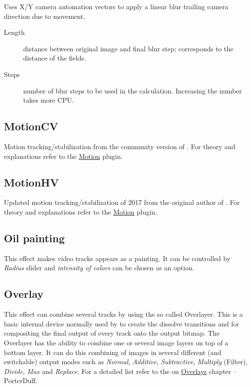 Uses X/Y camera automation vectors to apply a linear blur trailing camera direction due to movement.
\begin{description}
    \item[Length] distance between original image and final blur step; corresponds to the distance of the fields.
    \item[Steps] number of blur steps to be used in the calculation. Increasing the number takes more CPU.
\end{description}

\subsection{MotionCV}%
\label{sub:motioncv}

Motion tracking/stabilization from the community version of \CGG{}. For theory and explanations refer to the \hyperref[sub:motion]{Motion} plugin.

\subsection{MotionHV}%
\label{sub:motionhv}

Updated motion tracking/stabilization of 2017 from the original author of \CGG{}. For theory and explanations refer to the \hyperref[sub:motion]{Motion} plugin.

\subsection{Oil painting}%
\label{sub:oil_painting}

This effect makes video tracks appears as a painting. It can be controlled by \textit{Radius} slider and \textit{intensity of colors} can be chosen as an option.

\subsection{Overlay}%
\label{sub:overlay}

This effect can combine several tracks by using the so called Overlayer. This is a basic internal device normally used by \CGGI{} to create the dissolve transitions and for compositing the final output of every track onto the output bitmap. The Overlayer has the ability to combine one or several image layers on top of a bottom layer. It can do this combining of images in several different (and switchable) output modes such as \textit{Normal}, \textit{Additive}, \textit{Subtractive}, \textit{Multiply} (Filter), \textit{Divide}, \textit{Max} and \textit{Replace}. For a detailed list refer to the on \hyperref[cha:overlays]{Overlays} chapter  -- PorterDuff.

